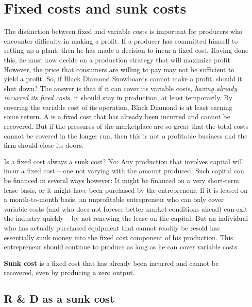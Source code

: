 \section{Fixed costs and sunk costs}\label{sec:ch8sec5}

The distinction between fixed and variable costs is important for producers
who encounter difficulty in making a profit. If a producer has committed
himself to setting up a plant, then he has made a decision to incur a fixed
cost. Having done this, he must now decide on a production strategy that
will maximize profit. However, the price that consumers are willing to pay
may not be sufficient to yield a profit. So, if Black Diamond Snowboards
cannot make a profit, should it shut down? The answer is that if it can
cover its variable costs, \textit{having already incurred its fixed costs},
it should stay in production, at least temporarily. By covering the variable
cost of its operation, Black Diamond is at least earning some return. A 
 is a fixed cost that has already been incurred and
cannot be recovered. But if the pressures of the marketplace are so great
that the total costs cannot be covered in the longer run, then this is not a
profitable business and the firm should close its doors.

Is a fixed cost always a sunk cost? No: Any production that involves capital
will incur a fixed cost -- one not varying with the amount produced. Such
capital can be financed in several ways however: It might be financed on a
very short-term lease basis, or it might have been purchased by the
entrepreneur. If it is leased on a month-to-month basis, an unprofitable
entrepreneur who can only cover variable costs (and who does not foresee
better market conditions ahead) can exit the industry quickly -- by not
renewing the lease on the capital. But an individual who has actually
purchased equipment that cannot readily be resold has essentially sunk money
into the fixed cost component of his production. This entrepreneur should
continue to produce as long as he can cover variable costs.

\begin{DefBox}
	\textbf{Sunk cost} is a fixed cost that has already been incurred and cannot be recovered, even by producing a zero output.
\end{DefBox}

\newhtmlpage

\subsection*{R \& D as a sunk cost}

